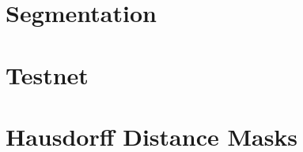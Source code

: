 % 

% 
% 
% 
% 
% 
% 
% 

% 
% 
% 
% 
% 
% 

\chapter{Segmentation}










\chapter{Testnet}


\chapter{Hausdorff Distance Masks}






%
%




%

